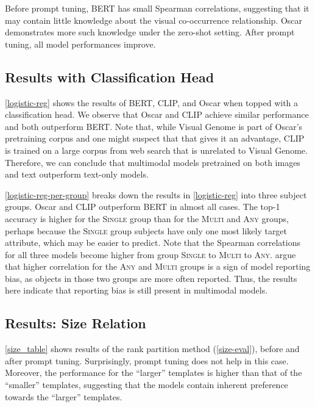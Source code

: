 \documentclass[11pt]{article}
\newcommand{\Single}{{\scshape Single}}
\newcommand{\Multi}{{\scshape Multi}}
\newcommand{\Any}{{\scshape Any}}
\begin{document}
Before prompt tuning, BERT has small Spearman correlations, suggesting that it may contain little knowledge about the visual co-occurrence relationship. Oscar demonstrates more such knowledge under the zero-shot setting. After prompt tuning, all model performances improve.


\subsection{Results with Classification Head}

\cref{logistic-reg} shows the results of BERT, CLIP, and Oscar when topped with a classification head. We observe that Oscar and CLIP achieve similar performance and both outperform BERT. Note that, while Visual Genome is part of Oscar's pretraining corpus and one might suspect that that gives it an advantage, CLIP is trained on a large corpus from web search that is unrelated to Visual Genome. Therefore, we can conclude that multimodal models pretrained on both images and text outperform text-only models.

\cref{logistic-reg-per-group} breaks down the results in \cref{logistic-reg} into three subject groups. Oscar and CLIP outperform BERT in almost all cases. The top-1 accuracy is higher for the \Single{} group than for the \Multi{} and \Any{} groups, perhaps because the \Single{} group subjects have only one most likely target attribute, which may be easier to predict. Note that the Spearman correlations for all three models become higher from group \Single{} to \Multi{} to \Any{}. \citet{paik-etal-2021-world} argue that higher correlation for the \Any{} and \Multi{} groups is a sign of model reporting bias, as objects in those two groups are more often reported. Thus, the results here indicate that reporting bias is still present in multimodal models.


\subsection{Results: Size Relation}

\cref{size_table} shows results of the rank partition method (\cref{size-eval}), before and after prompt tuning. Surprisingly, prompt tuning does not help in this case. Moreover, the performance for the ``larger'' templates is higher than that of the ``smaller'' templates, suggesting that the models contain inherent preference towards the ``larger'' templates.
\end{document}
